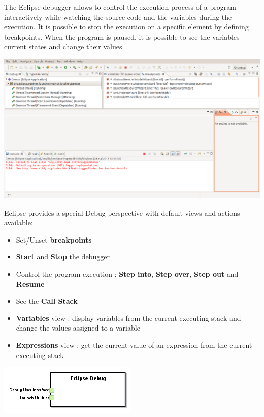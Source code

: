 \documentclass{gemoc} %
\begin{document}
The Eclipse debugger allows to control the execution process of a program interactively while watching the source code and the variables during the execution. It is possible to stop the execution on a specific element by defining breakpoints. When the program is paused, it is possible to see the variables current states and change their values.

\begin{center}
\includegraphics*[trim=0.0cm 0.0cm 0cm 0.0cm, clip=true, width=1.0\linewidth]{../images/EclipseDebugPerspective.png}
\end{center}

Eclipse provides a special Debug perspective with default views and actions available:
\begin{itemize}
\item Set/Unset \textbf{breakpoints}
\item \textbf{Start} and \textbf{Stop} the debugger
\item Control the program execution : \textbf{Step into}, \textbf{Step over}, \textbf{Step out} and \textbf{Resume}
\item See the \textbf{Call Stack}
\item \textbf{Variables} view : display variables from the current executing stack and change the values assigned to a variable
\item \textbf{Expressions} view : get the current value of an expression from the current executing stack
\end{itemize}

\begin{center}
\includegraphics*[trim=0.0cm 0.0cm 0cm 0.0cm, clip=true]{../images/generated/Generated_Eclipse_Debug.png}
\end{center}
\end{document}

